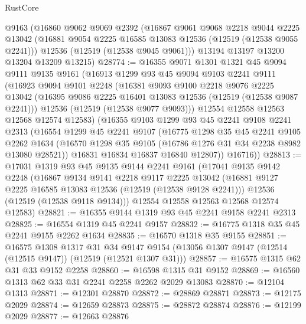 \begin{lexlean}{RustCore}
\begin{coremodule}
    @9163
    (@16860
      @9062
      @9069
      @2392
      (@16867
        @9061
        @9068
        @2218
        @9044
        @2225
        @13042
        (@16881 @9054 @2225 @16585 @13083 @12536 (@12519 (@12538 @9055 @2241)))
        @12536
        (@12519 (@12538 @9045 @9061)))
      @13194
      @13197
      @13200
      @13204
      @13209
      @13215)
@28774 := @16355
    @9071
    @1301
    @1321
    @45
    @9094
    @9111
    @9135
    @9161
    (@16913
      @1299
      @93
      @45
      @9094
      @9103
      @2241
      @9111
      (@16923
        @9094
        @9101
        @2248
        (@16381
          @9093
          @9100
          @2218
          @9076
          @2225
          @13042
          (@16395 @9086 @2225 @16401 @13083 @12536 (@12519 (@12538 @9087 @2241)))
          @12536
          (@12519 (@12538 @9077 @9093)))
        @12554
        @12558
        @12563
        @12568
        @12574
        @12583)
      (@16355
        @9103
        @1299
        @93
        @45
        @2241
        @9108
        @2241
        @2313
        (@16554
          @1299
          @45
          @2241
          @9107
          (@16775
            @1298
            @35
            @45
            @2241
            @9105
            @2262
            @1634
            (@16570 @1298 @35 @9105 (@16786 @1276 @31 @34 @2238 @8982 @13080 @28521))
            @16831
            @16834
            @16837
            @16840
            @12807))
        @16716))
@28813 := @17031
    @1319
    @93
    @45
    @9135
    @9144
    @2241
    @9161
    (@17041
      @9135
      @9142
      @2248
      (@16867
        @9134
        @9141
        @2218
        @9117
        @2225
        @13042
        (@16881 @9127 @2225 @16585 @13083 @12536 (@12519 (@12538 @9128 @2241)))
        @12536
        (@12519 (@12538 @9118 @9134)))
      @12554
      @12558
      @12563
      @12568
      @12574
      @12583)
@28821 := @16355 @9144 @1319 @93 @45 @2241 @9158 @2241 @2313
@28825 := @16554 @1319 @45 @2241 @9157
@28832 := @16775 @1318 @35 @45 @2241 @9155 @2262 @1634
@28835 := @16570 @1318 @35 @9155
@28851 := @16575
    @1308
    @1317
    @31
    @34
    @9147
    @9154
    (@13056 @1307 @9147 (@12514 (@12515 @9147)) (@12519 (@12521 @1307 @31)))
@28857 := @16575 @1315 @62 @31 @33 @9152 @2258
@28860 := @16598 @1315 @31 @9152
@28869 := @16560 @1313 @62 @33 @31 @2241 @2258 @2262 @2029 @13083
@28870 := @12104 @1313
@28871 := @12301 @28870
@28872 := @28869 @28871
@28873 := @12175 @2029
@28874 := @12659 @28873
@28875 := @28872 @28874
@28876 := @12199 @2029
@28877 := @12663 @28876

\end{coremodule}
\end{lexlean}
